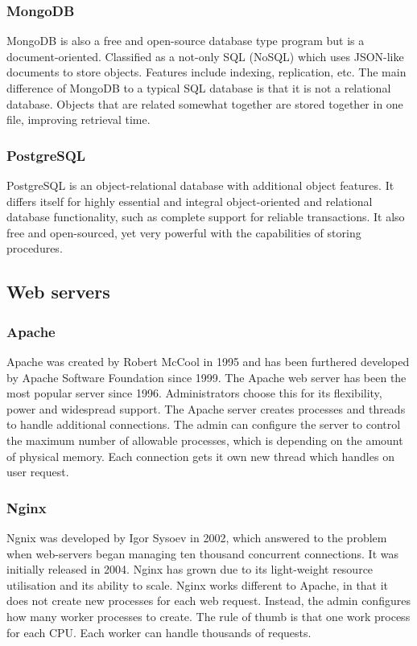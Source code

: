 \subsubsection{MongoDB}
MongoDB \cite{mongoDB} is also a free and open-source database type program but is a document-oriented. Classified as a not-only SQL (NoSQL) which uses JSON-like documents to store objects. Features include indexing, replication, etc. The main difference of MongoDB to a typical SQL database is that it is not a relational database. Objects that are related somewhat together are stored together in one file, improving retrieval time.

\subsubsection{PostgreSQL}
PostgreSQL \cite{postgreSQL} is an object-relational database with additional object features. It differs itself for highly essential and integral object-oriented and relational database functionality, such as complete support for reliable transactions. It also free and open-sourced, yet very powerful with the capabilities of storing procedures.

\subsection{Web servers}

\subsubsection{Apache}
Apache \cite{apache} was created by Robert McCool in 1995 and has been furthered developed by Apache Software Foundation since 1999. The Apache web server has been the most popular server since 1996. Administrators choose this for its flexibility, power and widespread support. The Apache server creates processes and threads to handle additional connections. The admin can configure the server to control the maximum number of allowable processes, which is depending on the amount of physical memory. Each connection gets it own new thread which handles on user request.

\subsubsection{Nginx}
Ngnix \cite{nginx} was developed by Igor Sysoev in 2002, which answered to the problem when web-servers began managing ten thousand concurrent connections. It was initially released in 2004. Nginx has grown due to its light-weight resource utilisation and its ability to scale. Nginx works different to Apache, in that it does not create new processes for each web request. Instead, the admin configures how many worker processes to create. The rule of thumb is that one work process for each CPU. Each worker can handle thousands of requests.

